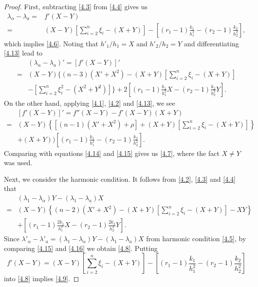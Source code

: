 \documentclass{amsart}
\theoremstyle{definition}
\theoremstyle{remark}
\numberwithin{equation}{section}
\begin{document}
\begin{proof}
 First, subtracting \eqref{4.3} from \eqref{4.4} gives us 
\begin{equation}
	\begin{aligned}\label{4.13}
	\lambda_{\alpha}-\lambda_a=&f'(X-Y)\\
	=&(X-Y)\left[ \sum^n_{i=2}\xi_i-(X+Y) \right]
	-\left[(r_1-1)\frac{k_1}{h^2_1}-(r_2-1)\frac{k_2}{h^2_2}\right],
\end{aligned}
\end{equation}
which implies \eqref{4.6}.
Noting that $h'_1/h_1=X$ and $h'_2/h_2=Y$
and differentiating \eqref{4.13} lead to
\begin{equation}\label{4.14}
\begin{aligned}
&( \lambda_{\alpha}-\lambda_a )'=\left[f'(X-Y)\right]'\\
=&(X-Y)\Bigg\{(n-3)(X'+X^2 )-(X+Y)\left[ \sum^n_{i=2}\xi_i-(X+Y) \right]\\
&-\left[ \sum^n_{i=2}\xi^2_i-(X^2+Y^2)\right] \Bigg\}
+2\left[ (r_1-1)\frac{k_1}{h^2_1}X-(r_2-1)\frac{k_2}{h^2_2}Y\right].
\end{aligned}
\end{equation}
On the other hand, applying \eqref{4.1}, \eqref{4.2} and \eqref{4.13}, we see
\begin{equation}\label{4.15}
\begin{aligned}
&\left[f'(X-Y)\right]'=f''(X-Y)-f'(X-Y)(X+Y)\\
=&(X-Y)\left\{[(n-1)(X'+X^2 )+\rho]+(X+Y)\left[ \sum^n_{i=2}\xi_i-(X+Y) \right]   \right\}\\
&+(X+Y))\left[ (r_1-1)\frac{k_1}{h^2_1}-(r_2-1)\frac{k_2}{h^2_2}\right].
\end{aligned}
\end{equation}
Comparing with equations \eqref{4.14} and \eqref{4.15} gives us \eqref{4.7},
where the fact $X\neq Y$ was used. 

\smallskip
Next, we consider the harmonic condition. It follows from \eqref{4.2}, \eqref{4.3} and \eqref{4.4} that 
\begin{equation}
\begin{aligned}\label{4.16}
&(\lambda_1-\lambda_\alpha)Y-(\lambda_1-\lambda_a)X\\
=&(X-Y)\left\{(n-2)(X'+X^2 )-(X+Y)\left[ \sum^n_{i=2}\xi_i-(X+Y) \right]-XY\right\}\\
&+\left[ (r_1-1)\frac{2k_1}{h^2_1}X-(r_2-1)\frac{2k_2}{h^2_2}Y\right].
\end{aligned}
\end{equation}
Since $\lambda'_\alpha-\lambda'_a=\left(\lambda_1-\lambda_\alpha \right)Y-\left(\lambda_1-\lambda_a \right)X$ from  harmonic condition \eqref{4.5},
by comparing \eqref{4.15} and \eqref{4.16} we obtain \eqref{4.8}.
Putting
\[
f'(X-Y)
=(X-Y)\left[ \sum^n_{i=2}\xi_i-(X+Y) \right]
-\left[(r_1-1)\frac{k_1}{h^2_1}-(r_2-1)\frac{k_2}{h^2_2}\right]
\]
into \eqref{4.8} implies \eqref{4.9}.


\end{proof}
\end{document}
